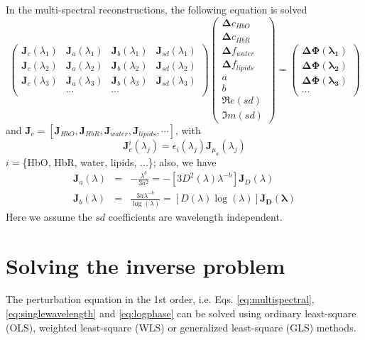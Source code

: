 \documentclass{article}
\begin{document}
In the multi-spectral reconstructions, the following equation is solved
\begin{equation}\label{eq:multispectral}
\left(
\begin{array}{llll}
\mathbf{J}_{c}(\lambda_1) & \mathbf{J}_{a}(\lambda_1) & \mathbf{J}_b(\lambda_1) & \mathbf{J}_{sd}(\lambda_1)\\
\mathbf{J}_{c}(\lambda_2) & \mathbf{J}_{a}(\lambda_2) & \mathbf{J}_b(\lambda_2) & \mathbf{J}_{sd}(\lambda_2)\\
\mathbf{J}_{c}(\lambda_3) & \mathbf{J}_{a}(\lambda_3) & \mathbf{J}_b(\lambda_3) & \mathbf{J}_{sd}(\lambda_3)\\
 & \cdots & \cdots 
\end{array}\right)
\left(
\begin{array}{c}
\boldsymbol{\Delta}{c_{HbO}}\\
\boldsymbol{\Delta}{c_{HbR}}\\
\boldsymbol{\Delta}{f_{water}}\\
\boldsymbol{\Delta}{f_{lipids}}\\
a\\
b\\
\Re e({sd})\\
\Im m({sd})
\end{array}
\right)=\left(
\begin{array}{c}
\boldsymbol{\Delta\Phi(\lambda_1)}\\
\boldsymbol{\Delta\Phi(\lambda_2)}\\
\boldsymbol{\Delta\Phi(\lambda_3)}\\
\cdots
\end{array}\right)
\end{equation}
and $\mathbf{J}_{c}=\left[\mathbf{J}_{HbO}, \mathbf{J}_{HbR}, \mathbf{J}_{water}, \mathbf{J}_{lipids}, \cdots\right]$, with
\begin{equation}
\mathbf{J}_{c}^i(\lambda_j)=\epsilon_i(\lambda_j)\mathbf{J}_{\mu_a}(\lambda_j)
\end{equation}
$i=$\{HbO, HbR, water, lipids, ...\}; also, we have
\begin{eqnarray}
\mathbf{J}_a(\lambda)&=&-\frac{\lambda^{b}}{3a^2} = -\left[3D^2(\lambda)\lambda^{-b}\right]\mathbf{J}_D(\lambda)\\
\mathbf{J}_b(\lambda)&=& \frac{3a\lambda^{-b}}{\log(\lambda)} =\left[D(\lambda)\log(\lambda)\right]\mathbf{J_D(\lambda)}
\end{eqnarray}
Here we assume the $sd$ coefficients are wavelength independent.

\section{Solving the inverse problem}
The perturbation equation in the 1st order, i.e. Eqs. \ref{eq:multispectral}, \ref{eq:singlewavelength} and \ref{eq:logphase} can be solved using ordinary least-square (OLS), weighted least-square (WLS) or generalized least-square (GLS) methods.
\end{document}
